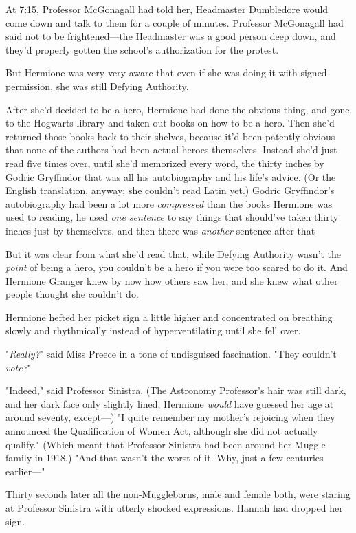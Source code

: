 At 7:15\PM, Professor McGonagall had told her, Headmaster Dumbledore would come
down and talk to them for a couple of minutes. Professor McGonagall had said
not to be frightened---the Headmaster was a good person deep down, and they'd
properly gotten the school's authorization for the protest.

But Hermione was very very aware that even if she was doing it with signed
permission, she was still Defying Authority.

After she'd decided to be a hero, Hermione had done the obvious thing, and gone
to the Hogwarts library and taken out books on how to be a hero. Then she'd
returned those books back to their shelves, because it'd been patently obvious
that none of the authors had been actual heroes themselves. Instead she'd just
read five times over, until she'd memorized every word, the thirty inches by
Godric Gryffindor that was all his autobiography and his life's advice. (Or the
English translation, anyway; she couldn't read Latin yet.) Godric Gryffindor's
autobiography had been a lot more \emph{compressed} than the books Hermione was
used to reading, he used \emph{one sentence} to say things that should've taken
thirty inches just by themselves, and then there was \emph{another} sentence
after that{\el}

But it was clear from what she'd read that, while Defying Authority wasn't the
\emph{point} of being a hero, you couldn't be a hero if you were too scared to
do it. And Hermione Granger knew by now how others saw her, and she knew what
other people thought she couldn't do.

Hermione hefted her picket sign a little higher and concentrated on breathing
slowly and rhythmically instead of hyperventilating until she fell over.

"\emph{Really?}" said Miss Preece in a tone of undisguised fascination. "They
couldn't \emph{vote?}"

"Indeed," said Professor Sinistra. (The Astronomy Professor's hair was still
dark, and her dark face only slightly lined; Hermione \emph{would} have guessed
her age at around seventy, except---) "I quite remember my mother's rejoicing
when they announced the Qualification of Women Act, although she did not
actually qualify." (Which meant that Professor Sinistra had been around her
Muggle family in 1918.) "And that wasn't the worst of it. Why, just a few
centuries earlier\mbox{---}"

Thirty seconds later all the non-Muggleborns, male and female both, were
staring at Professor Sinistra with utterly shocked expressions. Hannah had
dropped her sign.

